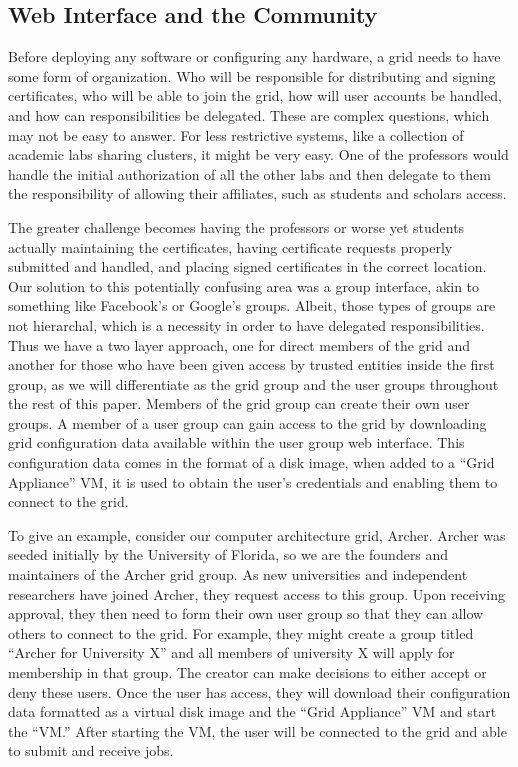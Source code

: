 \documentclass[conference]{IEEEtran}
\begin{document}
\subsection{Web Interface and the Community}

Before deploying any software or configuring any hardware, a grid needs to have
some form of organization.  Who will be responsible for distributing and
signing certificates, who will be able to join the grid, how will user accounts
be handled, and how can responsibilities be delegated.  These are complex
questions, which may not be easy to answer.  For less
restrictive systems, like a collection of academic labs sharing clusters, it
might be very easy.  One of the professors would handle the initial
authorization of all the other labs and then delegate to them the
responsibility of allowing their affiliates, such as students and scholars
access.

The greater challenge becomes having the professors or worse yet students
actually maintaining the certificates, having certificate requests properly
submitted and handled, and placing signed certificates in the correct location.
Our solution to this potentially confusing area was a group interface, akin to
something like Facebook's or Google's groups.  Albeit, those types of groups
are not hierarchal, which is a necessity in order to have delegated
responsibilities.  Thus we have a two layer approach, one for direct members of
the grid and another for those who have been given access by trusted entities
inside the first group, as we will differentiate as the grid group and the user
groups throughout the rest of this paper.  Members of the grid group can create
their own user groups.  A member of a user group can gain access to the grid by
downloading grid configuration data available within the user group web
interface.  This configuration data comes in the format of a disk image, when
added to a ``Grid Appliance'' VM, it is used to obtain the user's credentials
and enabling them to connect to the grid.

To give an example, consider our computer architecture grid, Archer.  Archer
was seeded initially by the University of Florida, so we are the founders and
maintainers of the Archer grid group.  As new universities and independent
researchers have joined Archer, they request access to this group.  Upon
receiving approval, they then need to form their own user group so that they
can allow others to connect to the grid.  For example, they might create a
group titled ``Archer for University X'' and all members of university X will
apply for membership in that group.  The creator can make decisions to either
accept or deny these users.  Once the user has access, they will download their
configuration data formatted as a virtual disk image and the ``Grid Appliance''
VM and start the ``VM.''  After starting the VM, the user will be connected to
the grid and able to submit and receive jobs.
\end{document}
